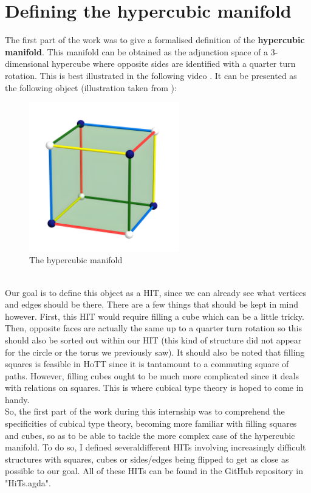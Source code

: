 \documentclass{report}
\begin{document}
\section{Defining the hypercubic manifold}
The first part of the work was to give a formalised definition of the \textbf{hypercubic manifold}. This manifold can be obtained as the adjunction space of a 3-dimensional hypercube where opposite sides are identified with a quarter turn rotation. This is best illustrated in the following video \cite{VHvideo}. It can be presented as the following object (illustration taken from \cite{hypercubic}):
\begin{figure}[h]
  \begin{center}
    \includegraphics[height= 6.5cm]{cube-3-2.png}
    \caption{The hypercubic manifold}
    \label{fig:H1M}
  \end{center}
\end{figure}\\
Our goal is to define this object as a HIT, since we can already see what vertices and edges should be there. There are a few things that should be kept in mind however. First, this HIT would require filling a cube which can be a little tricky. Then, opposite faces are actually the same up to a quarter turn rotation so this should also be sorted out within our HIT (this kind of structure did not appear for the circle or the torus we previously saw). It should also be noted that filling squares is feasible in HoTT since it is tantamount to a commuting square of paths. However, filling cubes ought to be much more complicated since it deals with relations on squares. This is where cubical type theory is hoped to come in handy.\\
So, the first part of the work during this internship was to comprehend the specificities of cubical type theory, becoming more familiar with filling squares and cubes, so as to be able to tackle the more complex case of the hypercubic manifold. To do so, I defined severaldifferent HITs involving increasingly difficult structures with squares, cubes or sides/edges being flipped to get as close as possible to our goal. All of these HITs can be found in the GitHub repository \cite{repo} in "HiTs.agda". 
\end{document}
